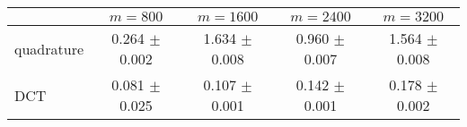 \centering
\renewcommand{\arraystretch}{1.2}
\begin{tabular}{@{}lcccc@{}}
\toprule
 & $m=800$ & $m=1600$ & $m=2400$ & $m=3200$\\
\midrule
quadrature & 0.264 $\pm$ 0.002 & 1.634 $\pm$ 0.008 & 0.960 $\pm$ 0.007 & 1.564 $\pm$ 0.008 \\
DCT & 0.081 $\pm$ 0.025 & 0.107 $\pm$ 0.001 & 0.142 $\pm$ 0.001 & 0.178 $\pm$ 0.002 \\
\bottomrule
\end{tabular}
